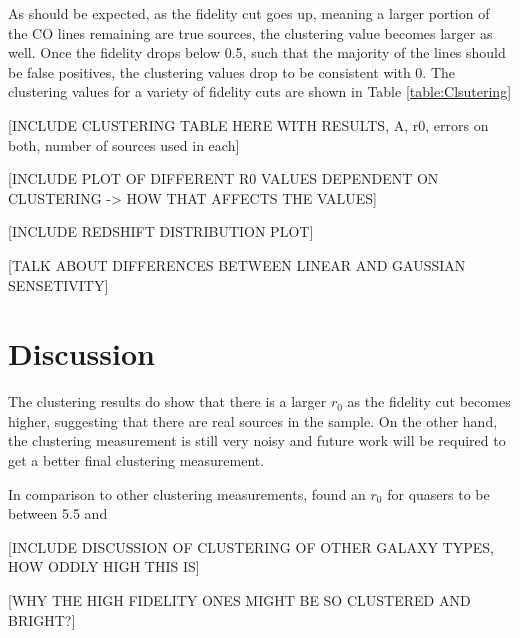 As should be expected, as the fidelity cut goes up, meaning a larger portion of the CO lines remaining are true sources, the clustering value becomes larger as well. Once the fidelity drops below 0.5, such that the majority of the lines should be false positives, the clustering values drop to be consistent with 0. The clustering values for a variety of fidelity cuts are shown in Table \ref{table:Clsutering}

[INCLUDE CLUSTERING TABLE HERE WITH RESULTS, A, r0, errors on both, number of sources used in each] \label{table:Clustering}

[INCLUDE PLOT OF DIFFERENT R0 VALUES DEPENDENT ON CLUSTERING -> HOW THAT AFFECTS THE VALUES]

[INCLUDE REDSHIFT DISTRIBUTION PLOT]

[TALK ABOUT DIFFERENCES BETWEEN LINEAR AND GAUSSIAN SENSETIVITY]

\section{Discussion}

The clustering results do show that there is a larger $r_0$ as the fidelity cut becomes higher, suggesting that there are real sources in the sample. On the other hand, the clustering measurement is still very noisy and future work will be required to get a better final clustering measurement. 

In comparison to other clustering measurements, \cite{hickox2011clustering} found an $r_0$ for quasers to be between 5.5 and 

[INCLUDE DISCUSSION OF CLUSTERING OF OTHER GALAXY TYPES, HOW ODDLY HIGH THIS IS]

[WHY THE HIGH FIDELITY ONES MIGHT BE SO CLUSTERED AND BRIGHT?]

